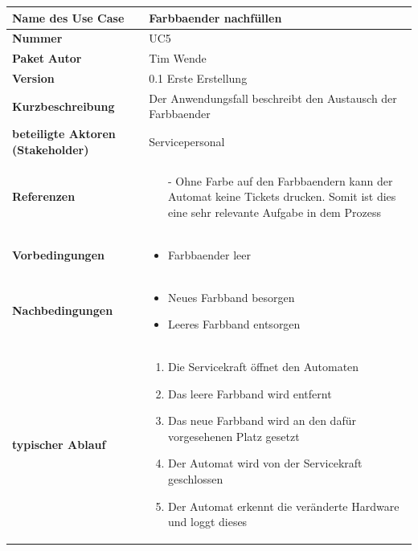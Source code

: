 \documentclass{article}
\begin{document}
    \begin{tabularx}{\textwidth}{|l|X|}
        \hline        
        \textcolor{fhmint}{\textbf{Name des Use Case}} & \LARGE\textcolor{fhmint}{\textbf{\gls{Farbbaender} nachfüllen}}\\
        \hline
        \textbf{Nummer} & UC5 \\\hline
        \textbf{Paket}
        \textbf{Autor} & Tim Wende \\\hline
        \textbf{Version} & 0.1 Erste Erstellung \\\hline
        \textbf{Kurzbeschreibung} & Der Anwendungsfall beschreibt den Austausch der \gls{Farbbaender} \\\hline
        \textbf{beteiligte Aktoren (\gls{Stakeholder})} & \gls{Servicepersonal} \\\hline
        \textbf{Referenzen} & \begin{itemize}
            \item[-] Ohne Farbe auf den \gls{Farbbaendern} kann der Automat keine \gls{Tickets} drucken.
                Somit ist dies eine sehr relevante Aufgabe in dem Prozess 
        \end{itemize} \\\hline
        \textbf{Vorbedingungen} & \begin{itemize}
            \item {Farbbaender} leer
        \end{itemize} \\\hline
        \textbf{Nachbedingungen} & \begin{itemize}
            \item Neues Farbband besorgen
            \item Leeres Farbband entsorgen
        \end{itemize} \\\hline
        \textbf{typischer Ablauf} & \begin{enumerate}
            \item Die Servicekraft öffnet den Automaten
            \item Das leere Farbband wird entfernt
            \item Das neue Farbband wird an den dafür vorgesehenen Platz gesetzt
            \item Der Automat wird von der Servicekraft geschlossen
            \item Der Automat erkennt die veränderte \gls{Hardware} und loggt dieses
        \end{enumerate} \\\hline

\end{tabularx}
\end{document}
